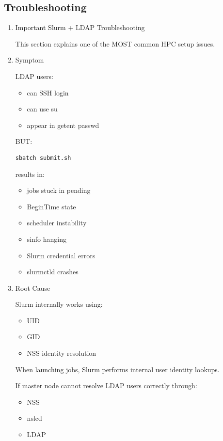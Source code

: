 \documentclass[11pt]{article}
\begin{document}
\subsection{Troubleshooting}
\label{sec:orga67c5fc}
\begin{enumerate}
\item Important Slurm + LDAP Troubleshooting
\label{sec:orga905b74}

This section explains one of the MOST common HPC setup issues.
\item Symptom
\label{sec:org8c13839}

LDAP users:

\begin{itemize}
\item can SSH login
\item can use su
\item appear in getent passwd
\end{itemize}

BUT:

\begin{verbatim}
sbatch submit.sh
\end{verbatim}

results in:

\begin{itemize}
\item jobs stuck in pending
\item BeginTime state
\item scheduler instability
\item sinfo hanging
\item Slurm credential errors
\item slurmctld crashes
\end{itemize}
\item Root Cause
\label{sec:org324beb4}

Slurm internally works using:

\begin{itemize}
\item UID
\item GID
\item NSS identity resolution
\end{itemize}

When launching jobs, Slurm performs internal user identity lookups.

If master node cannot resolve LDAP users correctly through:

\begin{itemize}
\item NSS
\item nslcd
\item LDAP
\end{itemize}


\end{enumerate}
\end{document}
